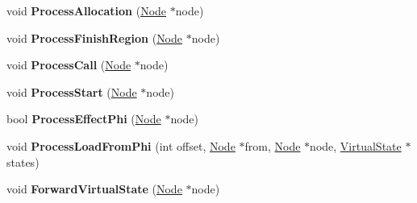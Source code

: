 \begin{DoxyCompactItemize}
\item 
void {\bfseries Process\+Allocation} (\hyperlink{classv8_1_1internal_1_1compiler_1_1_node}{Node} $\ast$node)\hypertarget{classv8_1_1internal_1_1compiler_1_1_escape_analysis_a4aacc00af52106073a50f9006c4a2a3e}{}\label{classv8_1_1internal_1_1compiler_1_1_escape_analysis_a4aacc00af52106073a50f9006c4a2a3e}

\item 
void {\bfseries Process\+Finish\+Region} (\hyperlink{classv8_1_1internal_1_1compiler_1_1_node}{Node} $\ast$node)\hypertarget{classv8_1_1internal_1_1compiler_1_1_escape_analysis_a2b9e6bf96ffc33c750c39d15b4d6a4ab}{}\label{classv8_1_1internal_1_1compiler_1_1_escape_analysis_a2b9e6bf96ffc33c750c39d15b4d6a4ab}

\item 
void {\bfseries Process\+Call} (\hyperlink{classv8_1_1internal_1_1compiler_1_1_node}{Node} $\ast$node)\hypertarget{classv8_1_1internal_1_1compiler_1_1_escape_analysis_a5f230ebf8e1588ce16dc880cdaa33a26}{}\label{classv8_1_1internal_1_1compiler_1_1_escape_analysis_a5f230ebf8e1588ce16dc880cdaa33a26}

\item 
void {\bfseries Process\+Start} (\hyperlink{classv8_1_1internal_1_1compiler_1_1_node}{Node} $\ast$node)\hypertarget{classv8_1_1internal_1_1compiler_1_1_escape_analysis_ac5274b018c23cc227b964b71fb399132}{}\label{classv8_1_1internal_1_1compiler_1_1_escape_analysis_ac5274b018c23cc227b964b71fb399132}

\item 
bool {\bfseries Process\+Effect\+Phi} (\hyperlink{classv8_1_1internal_1_1compiler_1_1_node}{Node} $\ast$node)\hypertarget{classv8_1_1internal_1_1compiler_1_1_escape_analysis_a106be4d908a1b35d5d132ef4eff081bd}{}\label{classv8_1_1internal_1_1compiler_1_1_escape_analysis_a106be4d908a1b35d5d132ef4eff081bd}

\item 
void {\bfseries Process\+Load\+From\+Phi} (int offset, \hyperlink{classv8_1_1internal_1_1compiler_1_1_node}{Node} $\ast$from, \hyperlink{classv8_1_1internal_1_1compiler_1_1_node}{Node} $\ast$node, \hyperlink{classv8_1_1internal_1_1compiler_1_1_virtual_state}{Virtual\+State} $\ast$states)\hypertarget{classv8_1_1internal_1_1compiler_1_1_escape_analysis_a6d9e2d44fa45ded8e0f3159bca517f4b}{}\label{classv8_1_1internal_1_1compiler_1_1_escape_analysis_a6d9e2d44fa45ded8e0f3159bca517f4b}

\item 
void {\bfseries Forward\+Virtual\+State} (\hyperlink{classv8_1_1internal_1_1compiler_1_1_node}{Node} $\ast$node)\hypertarget{classv8_1_1internal_1_1compiler_1_1_escape_analysis_a1eb99f6679e5d02368f16b9f18fdaea6}{}\label{classv8_1_1internal_1_1compiler_1_1_escape_analysis_a1eb99f6679e5d02368f16b9f18fdaea6}


\end{DoxyCompactItemize}
